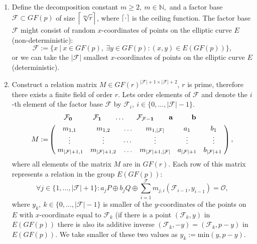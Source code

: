 \documentclass[thesis=M,english]{FITthesis}[2012/10/20]
\theoremstyle{remark}
\theoremstyle{definition}
\begin{document}
\begin{enumerate}
\item Define the decomposition constant $m \geq 2,\ m \in \mathbb{N},$ and a factor base $\mathcal{F} \subset GF(p)$ of size $\mathlarger{\Big\lceil \sqrt[m]{r} \Big\rceil}$, where $\lceil \cdot \rceil$ is the ceiling function. The factor base $\mathcal{F}$ might consist of random $x$-coordinates of points on the elliptic curve $E$ (non-deterministic):
$$
\mathcal{F} := \Big\{x\ \Big|\ x \in GF(p),\ \exists y \in GF(p): (x,y) \in E(GF(p))  \Big\},
$$
or we can take the $|\mathcal{F}|$ smallest $x$-coordinates of points on the elliptic curve $E$ (deterministic).
\item Construct a relation matrix $M \in GF(r)^{|\mathcal{F}| + 1 \times |\mathcal{F}| + 2}$, $r$ is prime, therefore there exists a finite field of order $r$. Lets order elements of $\mathcal{F}$ and denote the $i$-th element of the factor base $\mathcal{F}$ by $\mathcal{F}_i,\ i \in \{0,\ldots,|\mathcal{F}| - 1\}.$
\begin{align*}
&\begin{matrix}
\hphantom{........}\mathbf{\mathcal{F}_0} & \hphantom{.......} \mathbf{\mathcal{F}_1} & \hphantom{...}\ldots &\hphantom{...} \mathbf{\mathcal{F}_{\mathcal{F} - 1}} & \hphantom{....}\mathbf{a} & \hphantom{......} \mathbf{b}
\end{matrix}\\
M := &\begin{pmatrix}
m_{1,1} & m_{1,2} & \ldots & m_{1,|\mathcal{F}|} & a_1 & b_1 \\
\vdots & \vdots & \cdots & \vdots & \vdots  & \vdots  \\
\hphantom{.}m_{|\mathcal{F}| + 1,1} & m_{|\mathcal{F}| + 1,2} & \ldots & m_{|\mathcal{F}| + 1,|\mathcal{F}|} & a_{|\mathcal{F}| + 1} & b_{|\mathcal{F}| + 1} \hphantom{.}
\end{pmatrix},
\end{align*}
where all elements of the matrix $M$ are in $GF(r)$. Each row of this matrix represents a relation in the group $E(GF(p))$:
$$
\forall j \in \{1,\ldots,|\mathcal{F}| + 1\}: a_jP \oplus b_jQ \oplus \sum_{i=1}^{\mathcal{F}} m_{j,i} (\mathcal{F}_{i-1}, y_{i-1}) = \mathcal{O}, 
$$
where $y_k,\ k \in \{0,\ldots,|\mathcal{F}| - 1\}$ is smaller of the $y$-coordinates of the points on $E$ with $x$-coordinate equal to $\mathcal{F}_k$ (if there is a point $(\mathcal{F}_k, y)$ in $E(GF(p))$ there is also its additive inverse $(\mathcal{F}_k,-y) = (\mathcal{F}_k, p - y)$ in $E(GF(p))$. We take smaller of these two values as $y_k := \text{min}(y, p - y)$.  \\ \\

\end{enumerate}
\end{document}
